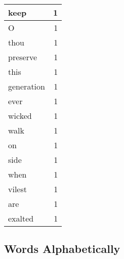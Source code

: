 \begin{center}
\begin{longtable}{l|r}
keep & 1 \\ \hline
O & 1 \\ \hline
thou & 1 \\ \hline
preserve & 1 \\ \hline
this & 1 \\ \hline
generation & 1 \\ \hline
ever & 1 \\ \hline
wicked & 1 \\ \hline
walk & 1 \\ \hline
on & 1 \\ \hline
side & 1 \\ \hline
when & 1 \\ \hline
vilest & 1 \\ \hline
are & 1 \\ \hline
exalted & 1 \\ \hline
\end{longtable}
\end{center}



\normalsize



\subsection{Words Alphabetically}

